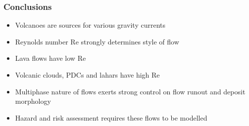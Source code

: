 \documentclass{beamer}
\begin{document}
\begin{frame}
  \frametitle{Conclusions}

  \begin{itemize}
  \item Volcanoes are sources for various gravity currents \\
  \item Reynolds number $\text{Re}$ strongly determines style of flow \\
  \item Lava flows have low $\text{Re}$ \\
  \item Volcanic clouds, PDCs and lahars have high $\text{Re}$ \\
  \item Multiphase nature of flows exerts strong control on flow runout and deposit morphology \\
  \item Hazard and risk assessment requires these flows to be modelled \\
  \end{itemize}

    
\end{frame}
\end{document}
